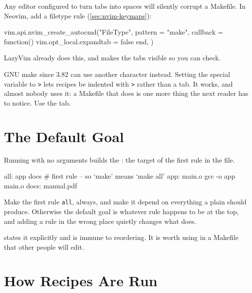 \begin{note}
	Any editor configured to turn tabs into spaces will silently corrupt a
	Makefile. In Neovim, add a filetype rule (\autoref{sec:nvim-keymaps}):
\begin{luacode}
vim.api.nvim_create_autocmd("FileType", {
  pattern = "make",
  callback = function() vim.opt_local.expandtab = false end,
})
\end{luacode}
	LazyVim already does this, and  makes the tabs visible so you
	can check.
\end{note}

\begin{remark}
	GNU make since 3.82 can use another character instead. Setting the special
	variable  to \texttt{>} lets recipes be indented with
	\texttt{>} rather than a tab. It works, and almost nobody uses it: a Makefile
	that does is one more thing the next reader has to notice. Use the tab.
\end{remark}

\section{The Default Goal}\label{sec:mk-goal}

Running  with no arguments builds the : the target
of the first rule in the file.

\begin{makecode}
all: app docs          # first rule -- so `make' means `make all'
app: main.o
    gcc -o app main.o
docs: manual.pdf
\end{makecode}

\begin{moral}
	Make the first rule \texttt{all}, always, and make it depend on everything a
	plain  should produce. Otherwise the default goal is whatever rule
	happens to be at the top, and adding a rule in the wrong place quietly changes
	what  does.
\end{moral}

\begin{note}
	 states it explicitly and is immune to reordering.
	It is worth using in a Makefile that other people will edit.
\end{note}

\section{How Recipes Are Run}\label{sec:mk-recipe}

